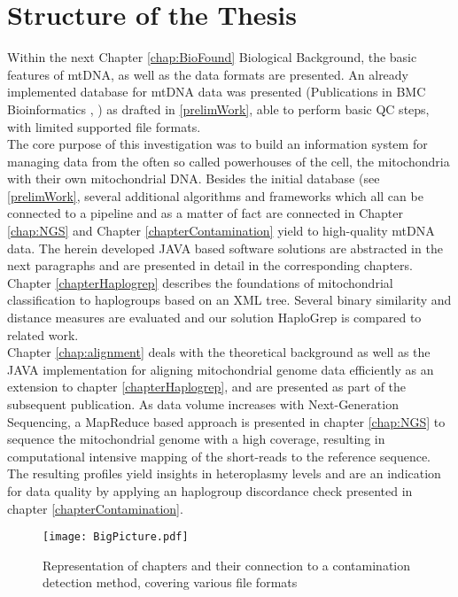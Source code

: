 \section{Structure of the Thesis}
\label{sect:ProblChar}
Within the next Chapter \ref{chap:BioFound} Biological Background, the basic features of mtDNA, as well as the data formats are presented. An already implemented database for mtDNA data was presented (Publications in BMC Bioinformatics \cite{Schoenherr2009}, \cite{Weissensteiner2010}) as drafted in \ref{prelimWork}, able to perform basic QC steps, with limited supported file formats.
\\
The core purpose of this investigation was to build an information system for managing data from the often so called powerhouses of the cell, the mitochondria with their own mitochondrial DNA. Besides the initial database (see \ref{prelimWork}, several additional algorithms and frameworks which all can be connected to a pipeline and as a matter of fact are connected in Chapter \ref{chap:NGS} and Chapter \ref{chapterContamination} yield to high-quality mtDNA data. The herein developed JAVA based software solutions are abstracted in the next paragraphs and are presented in detail in the corresponding chapters.
\\
Chapter \ref{chapterHaplogrep} describes the foundations of mitochondrial classification to haplogroups based on an XML tree. Several binary similarity and distance measures are evaluated and our solution HaploGrep is compared to related work. 
\\
Chapter \ref{chap:alignment} deals with the theoretical background as well as the JAVA implementation for aligning mitochondrial genome data efficiently as an extension to chapter \ref{chapterHaplogrep}, and are presented as part of the subsequent publication. As data volume increases with Next-Generation Sequencing, a MapReduce based approach is presented in chapter \ref{chap:NGS} to sequence the mitochondrial genome with a high coverage, resulting in computational intensive mapping of the short-reads to the reference sequence. 
\\
The resulting profiles yield insights in heteroplasmy levels and are an indication for data quality by applying an haplogroup discordance check presented in chapter \ref{chapterContamination}.
\begin{figure}[ht]
\begin{center}
\texttt{[image: BigPicture.pdf]}
\caption[Representation of chapters]{Representation of chapters and their connection to a contamination detection method, covering various file formats }
\label{fig:figureBigPic}
\end{center}
\end{figure}
